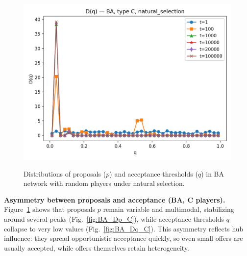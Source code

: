 \begin{figure}[h!]
\begin{minipage}[t]{0.48\textwidth}
        \includegraphics[width=\textwidth]{images/TASK1/Dq_BA_C_natural_selection.png}
        \label{fig:BA_Dq_C}
    \end{minipage}
    \caption{Distributions of proposals ($p$) and acceptance thresholds ($q$) in BA network with random players under natural selection.}
    \label{fig:BA_pq_C}
\end{figure}

\noindent\textbf{Asymmetry between proposals and acceptance (BA, C players).}  
Figure~\ref{fig:BA_pq_C} shows that proposals $p$ remain variable and
multimodal, stabilizing around several peaks (Fig.~\ref{fig:BA_Dp_C}), while
acceptance thresholds $q$ collapse to very low values
(Fig.~\ref{fig:BA_Dq_C}).  
This asymmetry reflects hub influence: they spread opportunistic acceptance
quickly, so even small offers are usually accepted, while offers themselves
retain heterogeneity.

